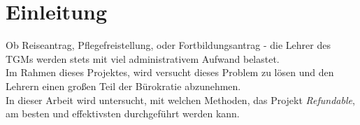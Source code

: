\chapter{Einleitung} 
Ob Reiseantrag, Pflegefreistellung, oder Fortbildungsantrag - die Lehrer des TGMs werden stets mit viel administrativem Aufwand belastet. 
~\\
Im Rahmen dieses Projektes, wird versucht dieses Problem zu lösen und den Lehrern einen großen Teil der Bürokratie abzunehmen.
~\\
In dieser Arbeit wird untersucht, mit welchen Methoden, das Projekt \textit{Refundable}, am besten und effektivsten durchgeführt werden kann.
